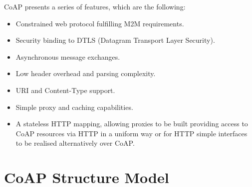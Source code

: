 \documentclass[11pt]{book}
\begin{document}
CoAP presents a series of features, which are the following:
\begin{itemize}
\item Constrained web protocol fulfilling M2M requirements.
\item Security binding to DTLS (Datagram Transport Layer Security).
\item Asynchronous message exchanges.
\item Low header overhead and parsing complexity.
\item URI and Content-Type support. 
\item Simple proxy and caching capabilities.
\item A stateless HTTP mapping, allowing proxies to be built providing access to CoAP resources via HTTP in a uniform way or for HTTP simple interfaces to be realised alternatively over CoAP.
\end{itemize}
\section{CoAP Structure Model}
\end{document}
